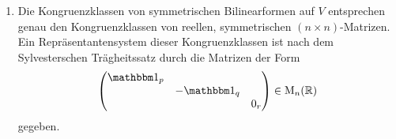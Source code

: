 \documentclass[a4paper, 10pt]{scrartcl}
\begin{document}
\begin{solution}
  \begin{enumerate}
    \item
      Die Kongruenzklassen von symmetrischen Bilinearformen auf $V$ entsprechen genau den Kongruenzklassen von reellen, symmetrischen $(n \times n)$-Matrizen.
      Ein Repräsentantensystem dieser Kongruenzklassen ist nach dem Sylvesterschen Trägheitssatz durch die Matrizen der Form
      \begin{equation}
        \label{equation: Sylvester}
        \begin{pmatrix}
          \Id_p &         &     \\
                & -\Id_q  &     \\
                &         & 0_r
        \end{pmatrix}
        \in
        \matrices{n}{\Real}
      \end{equation}
      gegeben.
      

\end{enumerate}
\end{solution}
\end{document}
